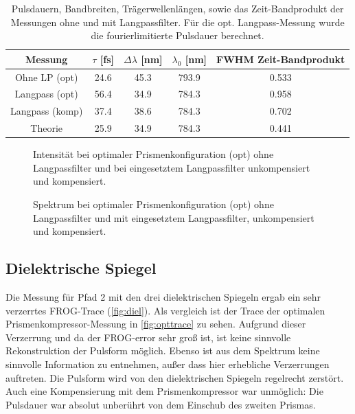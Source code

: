 \documentclass[twoside,        %
               BCOR12mm,       %
               english,ngerman, %
               fleqn,headsepline=false,footsepline=false
              ]{Vorlage/MFPREPORT}
\begin{document}
\begin{table}
    \centering
    \begin{tabular}[]{|c||c|c|c|c|}
        \hline
        Messung&$\tau$ [fs]&$\Delta\lambda$ [nm]&$\lambda_0$ [nm]&FWHM Zeit-Bandprodukt\\\hline
        Ohne LP (opt)&24.6&45.3&793.9&0.533\\\hline
        Langpass (opt)&56.4&34.9&784.3&0.958\\\hline
        Langpass (komp)&37.4&38.6&784.3&0.702\\\hline\hline
        Theorie &25.9&34.9&784.3&0.441\\\hline

    \end{tabular}
    \caption{Pulsdauern, Bandbreiten, Trägerwellenlängen, sowie das
    Zeit-Bandprodukt der Messungen ohne und mit Langpassfilter. Für die opt.
Langpass-Messung wurde die fourierlimitierte Pulsdauer berechnet. }
    \label{tab:long}
\end{table}


\begin{figure}[]
    \begin{center}
        
    \end{center}
    \caption{Intensität bei optimaler Prismenkonfiguration (opt) ohne
    Langpassfilter und bei
    eingesetztem Langpassfilter unkompensiert und kompensiert.}
    \label{fig:long1}
\end{figure}

\begin{figure}[]
    \begin{center}
        
    \end{center}
    \caption{Spektrum bei optimaler Prismenkonfiguration (opt) ohne
    Langpassfilter und mit eingesetztem Langpassfilter, unkompensiert und
    kompensiert.}
    \label{fig:long2}
\end{figure}

\subsection{Dielektrische Spiegel}
Die Messung für Pfad 2 mit den drei dielektrischen Spiegeln ergab ein sehr
verzerrtes FROG-Trace (\cref{fig:diel}). Als vergleich ist der Trace der optimalen
Prismenkompressor-Messung in \cref{fig:opttrace} zu sehen. Aufgrund dieser
Verzerrung und da der FROG-error sehr groß ist, ist keine sinnvolle
Rekonstruktion der Pulsform möglich. Ebenso ist aus dem Spektrum keine
sinnvolle Information zu entnehmen, außer dass hier erhebliche Verzerrungen
auftreten. Die Pulsform wird von den dielektrischen Spiegeln regelrecht
zerstört. Auch eine Kompensierung mit dem Prismenkompressor war unmöglich: Die
Pulsdauer war absolut unberührt von dem Einschub des zweiten Prismas.
\end{document}
